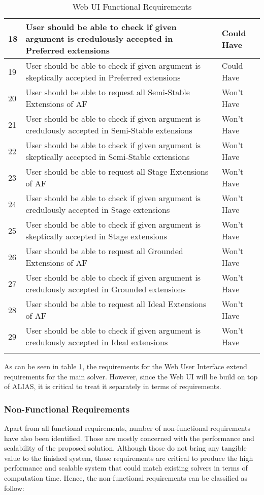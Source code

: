 \begin{longtable}[c]{|p{0.5cm}|p{10cm}|p{2.5cm}|}
	18 & User should be able to check if given argument is credulously accepted in Preferred extensions & Could Have \\ \hline
	19 & User should be able to check if given argument is skeptically accepted in Preferred extensions & Could Have \\ \hline
	20 & User should be able to request all Semi-Stable Extensions of AF & Won't Have \\ \hline
	21 & User should be able to check if given argument is credulously accepted in Semi-Stable extensions & Won't Have \\ \hline
	22 & User should be able to check if given argument is skeptically accepted in Semi-Stable extensions & Won't Have \\ \hline
	23 & User should be able to request all Stage Extensions of AF & Won't Have \\ \hline
	24 & User should be able to check if given argument is credulously accepted in Stage extensions & Won't Have \\ \hline
	25 & User should be able to check if given argument is skeptically accepted in Stage extensions & Won't Have \\ \hline
	26 & User should be able to request all Grounded Extensions of AF & Won't Have \\ \hline
	27 & User should be able to check if given argument is credulously accepted in Grounded extensions & Won't Have \\ \hline
	28 & User should be able to request all Ideal Extensions of AF & Won't Have \\ \hline
	29 & User should be able to check if given argument is credulously accepted in Ideal extensions & Won't Have \\ \hline
	\caption{Web UI Functional Requirements}
	\label{table:webUiRequirements}\\
\end{longtable}

As can be seen in table \ref{table:webUiRequirements}, the requirements for the Web User Interface extend requirements for the main solver. However, since the Web UI will be build on top of ALIAS, it is critical to treat it separately in terms of requirements. 

\subsubsection{Non-Functional Requirements}
Apart from all functional requirements, number of non-functional requirements have also been identified. Those are mostly concerned with the performance and scalability of the proposed solution. Although those do not bring any tangible value to the finished system, those requirements are critical to produce the high performance and scalable system that could match existing solvers in terms of computation time. Hence, the non-functional requirements can be classified as follow:

